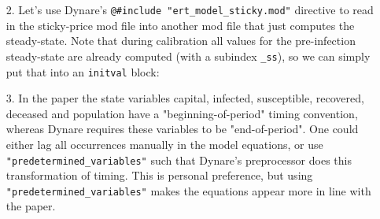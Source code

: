 \begin{itemize}

    \item[2.] Let's use Dynare's \texttt{@\#include "ert\_model\_sticky.mod"} directive to read in the sticky-price mod file into another mod file that just computes the steady-state.
Note that during calibration all values for the pre-infection steady-state are already computed (with a subindex \texttt{\_ss}),
  so we can simply put that into an \texttt{initval} block:


\item[3.] In the paper the state variables capital, infected, susceptible, recovered, deceased and population
  have a "beginning-of-period" timing convention,
  whereas Dynare requires these variables to be "end-of-period".
One could either lag all occurrences manually in the model equations,
  or use \texttt{"predetermined\_variables"} such that Dynare's preprocessor does this transformation of timing.
This is personal preference, but using \texttt{"predetermined\_variables"} makes the equations appear more in line with the paper.


\end{itemize}
